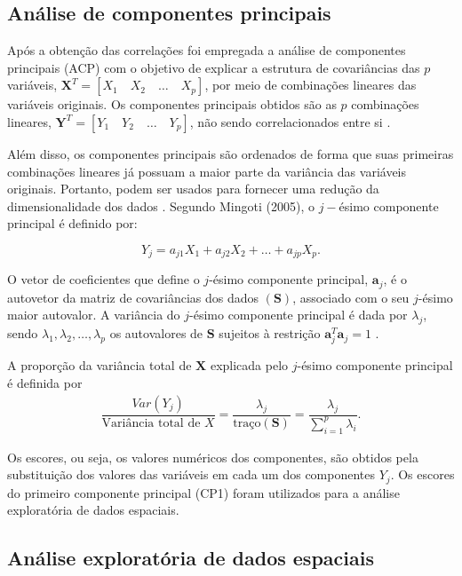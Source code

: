 \subsection{Análise de componentes principais}

Após a obtenção das correlações foi empregada a análise de componentes principais (ACP) com o objetivo de explicar a estrutura de covariâncias das $p$ variáveis, $\boldsymbol{X}^T = [X_1 \quad  X_2 \quad \dots \quad X_p]$, por meio de combinações lineares das variáveis originais. Os componentes principais obtidos são as $p$ combinações lineares, $\boldsymbol{Y}^T = [Y_1 \quad Y_2 \quad \dots \quad Y_p]$, não sendo correlacionados entre si \cite{mingoti10, everitt11}.

Além disso, os componentes principais são ordenados de forma que suas primeiras combinações lineares já possuam a maior parte da variância das variáveis originais. Portanto, podem ser usados para fornecer uma redução da dimensionalidade dos dados \cite{mingoti10, everitt11}. Segundo Mingoti (2005), o $j-$ésimo componente principal é definido por: 

\begin{equation*}
    Y_j = a_{j1}X_1 + a_{j2}X_2 + \dots + a_{jp}X_p.
\end{equation*}

O vetor de coeficientes que define o $j$-ésimo componente principal, $\boldsymbol{a}_j$, é o autovetor da matriz de covariâncias dos dados $(\boldsymbol{S})$, associado com o seu $j$-ésimo maior autovalor. A variância do $j$-ésimo componente principal é dada por $\lambda_j$, sendo  $\lambda_1, \lambda_2, \dots, \lambda_p$ os autovalores de $\boldsymbol{S}$ sujeitos à restrição $\boldsymbol{a}_j^T\boldsymbol{a}_j = 1$ \cite{everitt11}.
	
A proporção da variância total de $\boldsymbol{X}$ explicada pelo $j$-ésimo componente principal é definida por
\begin{align*}
	\dfrac{Var(Y_j)}{\textrm{Variância total de } X} = \dfrac{\lambda_j}{\textrm{traço}(\boldsymbol{S})} = \dfrac{\lambda_j}{\displaystyle\sum_{i=1}^{p}\lambda_i}.
\end{align*}

Os escores, ou seja, os valores numéricos dos componentes, são obtidos pela substituição dos valores das variáveis em cada um dos componentes $Y_j$. Os escores do primeiro componente principal (CP1) foram utilizados para a análise exploratória de dados espaciais.

\subsection{Análise exploratória de dados espaciais}

